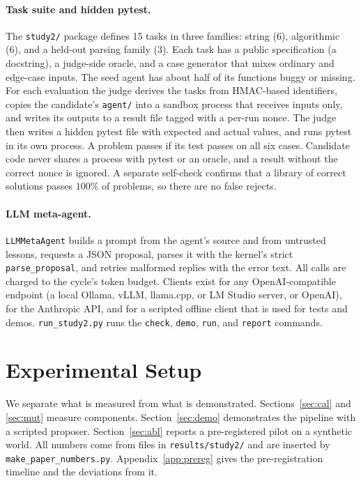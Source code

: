 \documentclass[11pt]{article}
\begin{document}
\paragraph{Task suite and hidden pytest.} The \texttt{study2/} package defines 15 tasks in three families: string (6), algorithmic (6), and a held-out parsing family (3). Each task has a public specification (a docstring), a judge-side oracle, and a case generator that mixes ordinary and edge-case inputs. The seed agent has about half of its functions buggy or missing.
For each evaluation the judge derives the tasks from HMAC-based identifiers, copies the candidate's \texttt{agent/} into a sandbox process that receives inputs only, and writes its outputs to a result file tagged with a per-run nonce.
The judge then writes a hidden pytest file with expected and actual values, and runs pytest in its own process. A problem passes if its test passes on all six cases. Candidate code never shares a process with pytest or an oracle, and a result without the correct nonce is ignored.
A separate self-check confirms that a library of correct solutions passes $100\%$ of problems, so there are no false rejects.

\paragraph{LLM meta-agent.} \texttt{LLMMetaAgent} builds a prompt from the agent's source and from untrusted lessons, requests a JSON proposal, parses it with the kernel's strict \texttt{parse\_proposal}, and retries malformed replies with the error text. All calls are charged to the cycle's token budget.
Clients exist for any OpenAI-compatible endpoint (a local Ollama, vLLM, llama.cpp, or LM Studio server, or OpenAI), for the Anthropic API, and for a scripted offline client that is used for tests and demos.
\texttt{run\_study2.py} runs the \texttt{check}, \texttt{demo}, \texttt{run}, and \texttt{report} commands.

\section{Experimental Setup}
\label{sec:setup}

We separate what is measured from what is demonstrated. Sections~\ref{sec:cal} and \ref{sec:mut} measure components. Section~\ref{sec:demo} demonstrates the pipeline with a scripted proposer. Section~\ref{sec:abl} reports a pre-registered pilot on a synthetic world.
All numbers come from files in \texttt{results/study2/} and are inserted by \texttt{make\_paper\_numbers.py}. Appendix~\ref{app:prereg} gives the pre-registration timeline and the deviations from it.
\end{document}
